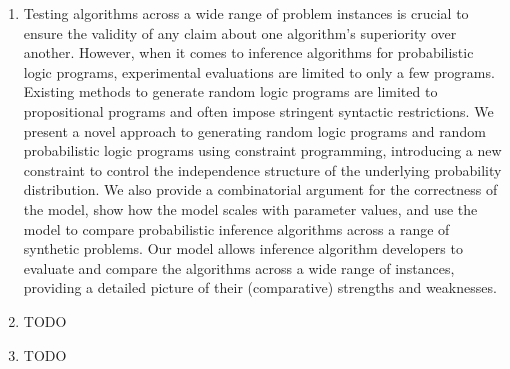 \begin{enumerate}
\item Testing algorithms across a wide range of problem instances is crucial to ensure the validity of any claim about one algorithm's superiority over another. However, when it comes to inference algorithms for probabilistic logic programs, experimental evaluations are limited to only a few programs. Existing methods to generate random logic programs are limited to propositional programs and often impose stringent syntactic restrictions. We present a novel approach to generating random logic programs and random probabilistic logic programs using constraint programming, introducing a new constraint to control the independence structure of the underlying probability distribution. We also provide a combinatorial argument for the correctness of the model, show how the model scales with parameter values, and use the model to compare probabilistic inference algorithms across a range of synthetic problems. Our model allows inference algorithm developers to evaluate and compare the algorithms across a wide range of instances, providing a detailed picture of their (comparative) strengths and weaknesses.
\item TODO
\item TODO
\end{enumerate}
